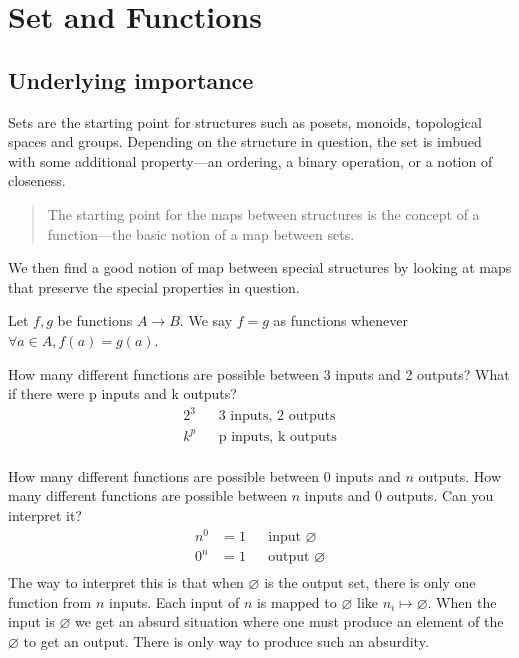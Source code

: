 \section{Set and Functions}
\subsection{Underlying importance}
Sets are the starting point for structures such as posets, monoids, topological
spaces and groups. Depending on the structure in question, the set is imbued
with some additional property---an ordering, a binary operation, or a notion of
closeness.
\begin{quote}
The starting point for the maps between structures is the concept of a
function---the basic notion of a map between sets.
\end{quote}
We then find a good notion of map between special structures by
looking at maps that preserve the special properties in question.
\begin{definition}
Let $f, g$ be functions $A\rightarrow B$. We say $f = g$ as functions whenever
$\forall a \in A, f(a) = g(a)$.
\end{definition}
\begin{ttta}
How many different functions are possible between 3 inputs and 2 outputs? What
if there were p inputs and k outputs?
\begin{align*}
    2^3&&\text{3 inputs, 2 outputs}\\
    k^p&&\text{p inputs, k outputs}\\
\end{align*}
\end{ttta}
\begin{ttta}
How many different functions are possible between $0$ inputs and $n$ outputs.
How many different functions are possible between $n$ inputs and $0$ outputs.
Can you interpret it?
\begin{align*}
    n^0&=1&&\text{input }\varnothing\\
    0^n&=1&&\text{output }\varnothing\\
\end{align*}
The way to interpret this is that when $\varnothing$ is the output set, there is
only one function from $n$ inputs.  Each input of $n$ is mapped to $\varnothing$
like $n_i \mapsto \varnothing$. When the input is $\varnothing$ we get an absurd
situation where one must produce an element of the $\varnothing$ to get an output.
There is only way to produce such an absurdity.
\end{ttta}
